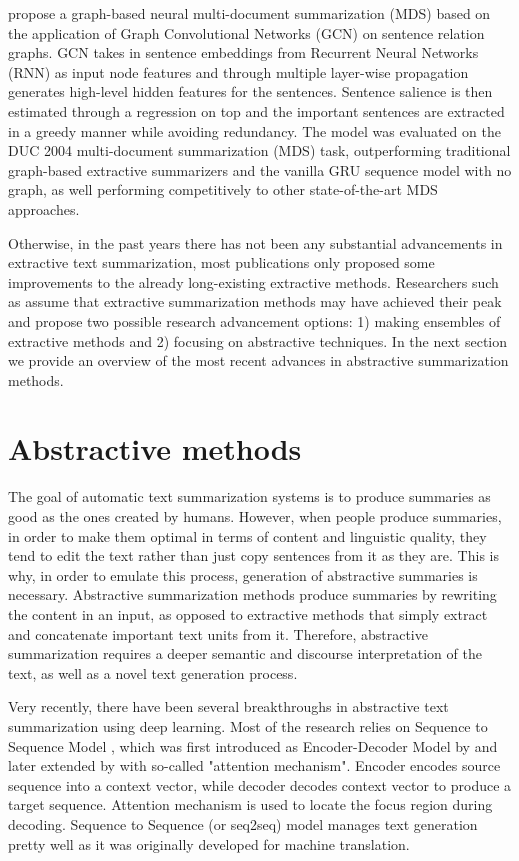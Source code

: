 \documentclass[11pt,a4paper,onecolumn]{article}
\begin{document}
\cite{yasunaga2017graph} propose a graph-based neural multi-document summarization (MDS) based on the application of Graph Convolutional Networks (GCN) \cite{kipf2016semi} on sentence relation graphs.
GCN takes in sentence embeddings from Recurrent Neural Networks (RNN) as input node features and through multiple layer-wise propagation generates high-level hidden features for the sentences.
Sentence salience is then estimated through a regression on top and the important sentences are extracted in a greedy manner while avoiding redundancy.
The model was evaluated on the DUC 2004 multi-document summarization (MDS) task, outperforming traditional graph-based extractive summarizers and the vanilla GRU sequence model with no graph, as well performing competitively to other state-of-the-art MDS approaches.

Otherwise, in the past years there has not been any substantial advancements in extractive text summarization, most publications only proposed some improvements to the already long-existing extractive methods.
Researchers such as \cite{mehta2016extractive} assume that extractive summarization methods may have achieved their peak and propose two possible research advancement options:  1) making ensembles of extractive methods and 2) focusing on abstractive techniques.
In the next section we provide an overview of the most recent advances in abstractive summarization methods.

\section{Abstractive methods} \label{abstractive}
The goal of automatic text summarization systems is to produce summaries as good as the ones created by humans.
However, when people produce summaries, in order to make them optimal in terms of content and linguistic quality, they tend to edit the text rather than just copy sentences from it as they are.
This is why, in order to emulate this process, generation of abstractive summaries is necessary.
Abstractive summarization methods produce summaries by rewriting the content in an input, as opposed to extractive methods that simply extract and concatenate important text units from it.
Therefore, abstractive summarization requires a deeper semantic and discourse interpretation of the text, as well as a novel text generation process.

Very recently, there have been several breakthroughs in abstractive text summarization using deep learning.
Most of the research relies on Sequence to Sequence Model \cite{sutskever2014sequence}, which was first introduced as Encoder-Decoder Model by \cite{cho2014learning} and later extended by \cite{bahdanau2014neural} with so-called "attention mechanism".
Encoder encodes source sequence into a context vector, while decoder decodes context vector to produce a target sequence. Attention mechanism is used to locate the focus region  during decoding.
Sequence to Sequence (or seq2seq) model manages text generation pretty well as it was originally developed for machine translation.
\end{document}
